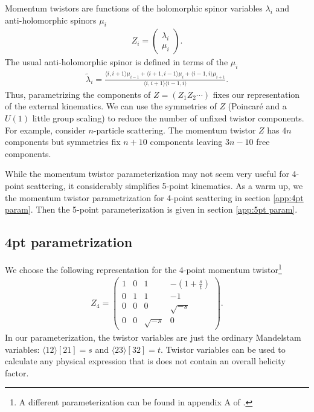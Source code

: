 \documentclass[11pt]{article}
\newcommand{\la}{\langle}
\newcommand{\ra}{\rangle}
\begin{document}
Momentum twistors are functions of the holomorphic spinor variables $\lambda_{i}$ and anti-holomorphic spinors $\mu_{i}$
\begin{align}
	Z_i = \begin{pmatrix} \lambda_{i} \\ \mu_{i} \end{pmatrix}. 
\end{align}
The usual anti-holomorphic spinor is defined in terms of the $\mu_{i}$ \cite{Elvang:2015rqa}
\begin{align}
	\tilde{\lambda}_{i} = \frac{\la i,i+1 \ra \mu_{i-1} + \la i+1, i-1 \ra \mu_{i} + \la i-1, i \ra \mu_{i+1}}{\la i,i+1 \ra \la i-1, i \ra}.
\end{align}
Thus, parametrizing the components of $Z=(Z_1 Z_2 \cdots )$ fixes our representation of the external kinematics. We can use the symmetries of $Z$ (Poincar\'e and a $U(1)$ little group scaling) to reduce the number of unfixed twistor components. For example, consider $n$-particle scattering. The momentum twistor $Z$ has $4n$ components but symmetries fix $n + 10$ components leaving $3n-10$ free components. 

While the momentum twistor parameterization may not seem very useful for 4-point scattering, it considerably simplifies 5-point kinematics. As a warm up, we the momentum twistor parametrization for 4-point scattering in section \ref{app:4pt param}. Then the 5-point parameterization is given in section \ref{app:5pt param}.


\subsection{4pt parametrization \label{app:4pt param} }

We choose the following representation for the 4-point momentum twistor\footnote{A different parameterization can be found in appendix A of \cite{Badger:2013gxa}.}
\begin{align}
	Z_4 = 
	\begin{pmatrix}
		1 & 0 & 1 & -\left(1+\frac{s}{t}\right) \\
		0 & 1 & 1 & -1 \\
		0 & 0 & 0 & \sqrt{-s} \\
		0 & 0 & \sqrt{-s} & 0
	\end{pmatrix}.
\end{align}
In our parameterization, the twistor variables are just the ordinary Mandelstam variables: $\la 12 \ra [21] = s$ and $\la 23 \ra [32] = t$. Twistor variables can be used to calculate any physical expression that is does not contain an overall helicity factor.
\end{document}
